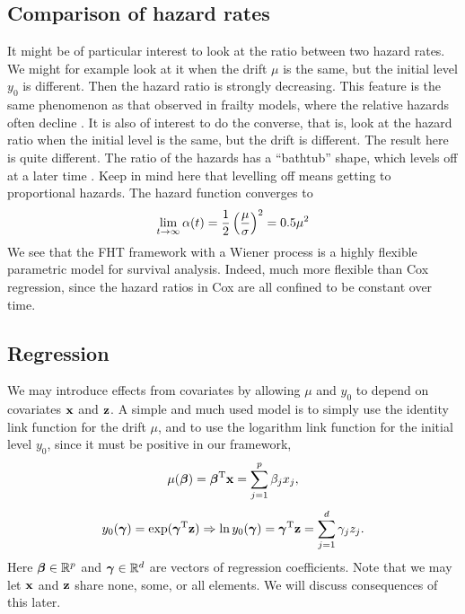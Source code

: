 \subsection{Comparison of hazard rates}
It might be of particular interest to look at the ratio between two hazard rates. We might for example look at it when the drift $\mu$ is the same, but the initial level $y_0$ is different. Then the hazard ratio is strongly decreasing. This feature is the same phenomenon as that observed in frailty models, where the relative hazards often decline \citep{ABG}.
It is also of interest to do the converse, that is, look at the hazard ratio when the initial level is the same, but the drift is different. The result here is quite different. The ratio of the hazards has a ``bathtub'' shape, which levels off at a later time \citep{ABG}. Keep in mind here that levelling off means getting to proportional hazards. The hazard function converges to
\begin{equation}
    \lim_{t\to\infty}\alpha(t)=\frac{1}{2}\left(\frac{\mu}{\sigma}\right)^2=0.5\mu^2
\end{equation}
We see that the FHT framework with a Wiener process is a highly flexible parametric model for survival analysis. Indeed, much more flexible than Cox regression, since the hazard ratios in Cox are all confined to be constant over time.

\subsection{Regression}\label{subsec:IG-reg}
We may introduce effects from covariates by allowing $\mu$ and $y_0$ to depend on covariates $\mathbf{x}$ and $\mathbf{z}$. A simple and much used model
\citep{leewhitmore2006, caroni2017}
is to simply use the identity link function for the drift $\mu$, and to use the logarithm link function for the initial level $y_0$, since it must be positive in our framework,
\begin{equation}\label{eq:y0}
    \mu(\boldsymbol{\beta})=\boldsymbol{\beta}^{\text{T}}\mathbf{x}=\sum_{j=1}^p \beta_jx_j,
\end{equation}
\begin{equation}\label{eq:mu}
    y_0(\boldsymbol{\gamma})=\exp(\boldsymbol{\gamma}^{\text{T}}\mathbf{z})\Rightarrow\ln y_0(\boldsymbol{\gamma})=\boldsymbol{\gamma}^{\text{T}}\mathbf{z}=\sum_{j=1}^d \gamma_jz_j.
\end{equation}
Here $\boldsymbol{\beta}\in\mathbb{R}^p$ and $\boldsymbol{\gamma}\in\mathbb{R}^d$ are vectors of regression coefficients. Note that we may let $\mathbf{x}$ and $\mathbf{z}$ share none, some, or all elements. We will discuss consequences of this later.

